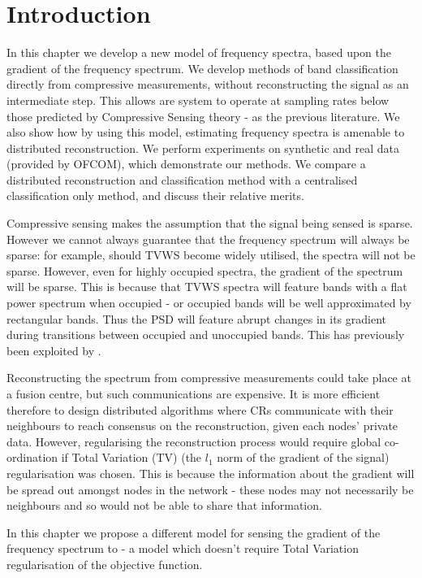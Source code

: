 \section{Introduction}

In this chapter we develop a new model of frequency spectra, based upon the gradient of the frequency spectrum. We develop methods of band classification directly from compressive measurements, without reconstructing the signal as an intermediate step. This allows are system to operate at sampling rates below those predicted by Compressive Sensing theory - as the previous literature. We also show how by using this model, estimating frequency spectra is amenable to distributed reconstruction. We perform experiments on synthetic and real data (provided by OFCOM), which demonstrate our methods. We compare a distributed reconstruction and classification method with a centralised classification only method, and discuss their relative merits.

Compressive sensing makes the assumption that the signal being sensed is sparse. However we cannot always guarantee that the frequency spectrum will always be sparse: for example, should TVWS become widely utilised, the spectra will not be sparse. However, even for highly occupied spectra, the gradient of the spectrum will be sparse. This is because that TVWS spectra will feature bands with a flat power spectrum when occupied - or occupied bands will be well approximated by rectangular bands. Thus the PSD will feature abrupt changes in its gradient during transitions between occupied and unoccupied bands. This has previously been exploited by \cite{tian2006wavelet}. 

Reconstructing the spectrum from compressive measurements could take place at a fusion centre, but such communications are expensive. It is more efficient therefore to design distributed algorithms where CRs communicate with their neighbours to reach consensus on the reconstruction, given each nodes' private data. However, regularising the reconstruction process would require global co-ordination if Total Variation (TV) (the \(l_1\) norm of the gradient of the signal) regularisation was chosen. This is because the information about the gradient will be spread out amongst nodes in the network - these nodes may not necessarily be neighbours and so would not be able to share that information.

In this chapter we propose a different model for sensing the gradient of the frequency spectrum to \cite{tian2006wavelet} - a model which doesn't require Total Variation regularisation of the objective function. 

